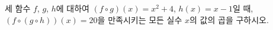 세 함수 $f$, $g$, $h$에 대하여 $(f\circ g)(x)=x^2+4$, $h(x)=x-1$일 때, $(f\circ(g\circ h))(x)=20$을 만족시키는 모든 실수 $x$의 값의 곱을 구하시오.
